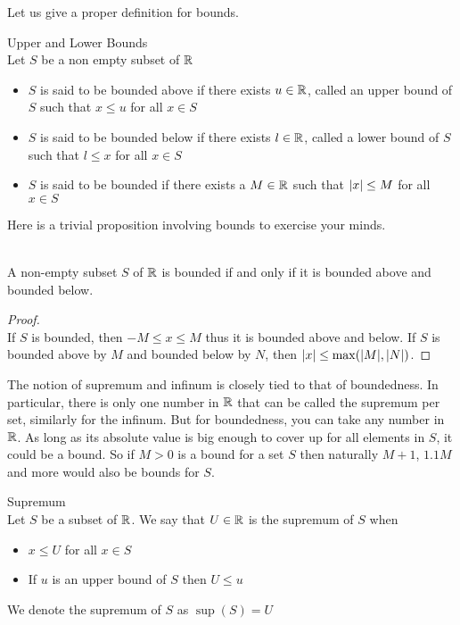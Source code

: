\documentclass[a4paper]{article}
\begin{document}
Let us give a proper definition for bounds. 
\begin{defn}{Upper and Lower Bounds}{}\\ Let $S$ be a non empty subset of $\mathbb{R}$ 
\begin{itemize}
\item $S$ is said to be bounded above if there exists $u\in\mathbb{R}$, called an upper bound of $S$ such that $x\leq u$ for all $x\in S$
\item $S$ is said to be bounded below if there exists $l\in\mathbb{R}$, called a lower bound of $S$ such that $l\leq x$ for all $x\in S$
\item $S$ is said to be bounded if there exists a $M\in\mathbb{R}$ such that $\abs{x}\leq M$ for all $x\in S$
\end{itemize}
\end{defn}

Here is a trivial proposition involving bounds to exercise your minds. 

\begin{prp}{}{}\\ A non-empty subset $S$ of $\mathbb{R}$ is bounded if and only if it is bounded above and bounded below. 
\begin{proof}\\ If $S$ is bounded, then $-M\leq x\leq M$ thus it is bounded above and below. If $S$ is bounded above by $M$ and bounded below by $N$, then $\abs{x}\leq\max(\abs{M},\abs{N})$. 
\end{proof}
\end{prp}

The notion of supremum and infinum is closely tied to that of boundedness. In particular, there is only one number in $\mathbb{R}$ that can be called the supremum per set, similarly for the infinum. But for boundedness, you can take any number in $\mathbb{R}$. As long as its absolute value is big enough to cover up for all elements in $S$, it could be a bound. So if $M>0$ is a bound for a set $S$ then naturally $M+1$, $1.1M$ and more would also be bounds for $S$. 

\begin{defn}{Supremum}{}\\ Let $S$ be a subset of $\mathbb{R}$. We say that $U\in\mathbb{R}$ is the supremum of $S$ when
\begin{itemize}
\item $x\leq U$ for all $x\in S$
\item If $u$ is an upper bound of $S$ then $U\leq u$
\end{itemize}
We denote the supremum of $S$ as $\sup(S)=U$
\end{defn}
\end{document}
